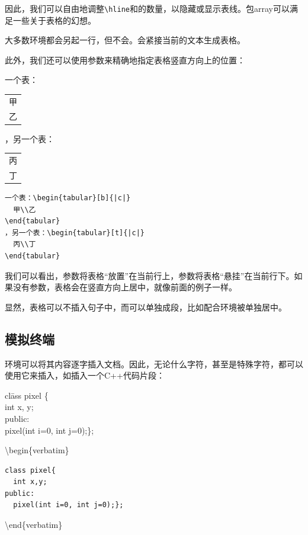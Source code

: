 因此，我们可以自由地调整\verb|\hline|和\dm{|}的数量，以隐藏或显示表线。包\textsf{array}可以满足一些关于表格的幻想。

\begin{exclamation}
大多数环境都会另起一行，但不会。会紧接当前的文本生成表格。
\end{exclamation}

此外，我们还可以使用参数来精确地指定表格竖直方向上的位置：

\begin{codelist}[2.12]{
一个表：\begin{tabular}[b]{|c|} 
甲\\乙
\end{tabular}
，另一个表：\begin{tabular}[t]{|c|} 
丙\\丁\end{tabular}
}\begin{verbatim}一个表：\begin{tabular}[b]{|c|} 
  甲\\乙
\end{tabular}
，另一个表：\begin{tabular}[t]{|c|} 
  丙\\丁
\end{tabular}
\end{verbatim}
\end{codelist}

我们可以看出，参数将表格“放置”在当前行上，参数将表格“悬挂”在当前行下。如果没有参数，表格会在竖直方向上居中，就像前面的例子一样。

显然，表格可以不插入句子中，而可以单独成段，比如配合环境被单独居中。

\subsection{模拟终端}

环境可以将其内容逐字插入文档。因此，无论什么字符，甚至是特殊字符，都可以使用它来插入，如插入一个\textsf{C++}代码片段：

\begin{codelist}[2.13]{\ttfamily
  \begin{tabbing}
    cl\=ass pixel \{\\
      \>int x, y;\\
    public:\\
      \>pixel(int i=0, int j=0);\};
  \end{tabbing}
}
\ttfamily
\backslash begin\{verbatim\}
\begin{verbatim}
class pixel{
  int x,y;
public:
  pixel(int i=0, int j=0);};
\end{verbatim}
\backslash end\{verbatim\}
\end{codelist}

